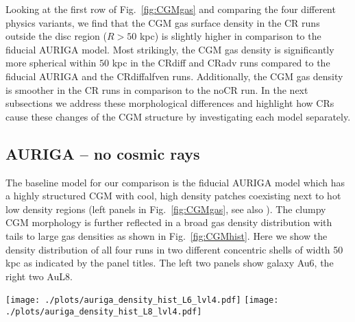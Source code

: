 \documentclass[useAMS,usenatbib]{mnras}
\begin{document}
Looking at the first row of Fig.\ \ref{fig:CGMgas} and comparing the four different physics variants, we find that the CGM gas surface density in the CR runs outside the disc region ($R>50$ kpc) is slightly higher in comparison to the fiducial AURIGA model. Most strikingly, the CGM gas density is significantly more spherical within $50$ kpc in the CRdiff and CRadv runs compared to the fiducial AURIGA  and the CRdiffalfven runs. Additionally, the CGM gas density is smoother in the CR runs in comparison to the noCR run. In the next subsections we address these morphological differences and highlight how CRs cause these changes of the CGM structure by investigating each model separately.

\subsection{AURIGA -- no cosmic rays}
The baseline model for our comparison is the fiducial AURIGA model which has a highly structured CGM with cool, high density patches coexisting next to hot low density regions (left panels in Fig.\ \ref{fig:CGMgas}, see also \citealt{Vandevoort2019}). The clumpy CGM morphology is further reflected in a broad gas density distribution with tails to large gas densities as shown in Fig.\ \ref{fig:CGMhist}. Here we show the density distribution of all four runs in two different concentric shells of width 50 kpc as indicated by the panel titles. The left two panels show galaxy Au6, the right two AuL8.

\begin{figure*}
\vspace*{-.4cm}
\hspace{-.4cm}
\texttt{[image: ./plots/auriga\_density\_hist\_L6\_lvl4.pdf]}
\hspace{-.4cm}
\texttt{[image: ./plots/auriga\_density\_hist\_L8\_lvl4.pdf]}
\vspace{-.35cm}
\caption{Distribution of gas density in two different $50$ kpc wide spherical shells for the Au6 halo in the two left most panels and the Au8 halo in the two right most ones. The CRadv and CRdiff runs exhibit narrower density distributions in comparison to the other two models indicating a smoother CGM.}
\label{fig:CGMhist}
\end{figure*}
\end{document}
